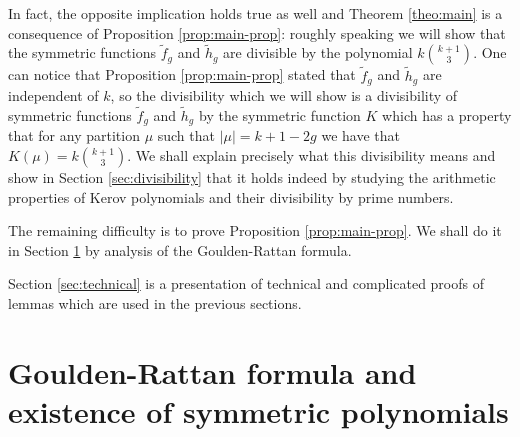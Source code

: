 \documentclass[12pt]{amsart}
\theoremstyle{plain}
\theoremstyle{remark}
\begin{document}
In fact, the opposite implication holds true as well and Theorem
\ref{theo:main} is a consequence of Proposition \ref{prop:main-prop}: roughly
speaking we will show that the symmetric functions $\tilde{f}_g$ and
$\tilde{h}_g$ are divisible by the polynomial $k \binom{k+1}{3}$. One can
notice that Proposition \ref{prop:main-prop} stated that $\tilde{f}_g$ and
$\tilde{h}_g$ are independent of $k$, so the divisibility which  we will show is
a divisibility of symmetric functions $\tilde{f}_g$ and
$\tilde{h}_g$ by the symmetric function $K$ which has a property that for any
partition $\mu$ such that $|\mu| = k +1 - 2g$ we have that $K(\mu) = k
\binom{k+1}{3}$. We shall explain precisely
what this divisibility means and
show in Section \ref{sec:divisibility} that it holds indeed by
studying the arithmetic properties of Kerov polynomials and their divisibility
by prime numbers.

The remaining difficulty is to prove Proposition \ref{prop:main-prop}. We shall
do it in Section \ref{sec:existence} by analysis of the Goulden-Rattan formula.

Section \ref{sec:technical} is a presentation of technical and complicated
proofs of lemmas which are used in the previous sections.



\section{Goulden-Rattan formula and existence of symmetric polynomials}
\label{sec:existence}
\end{document}
